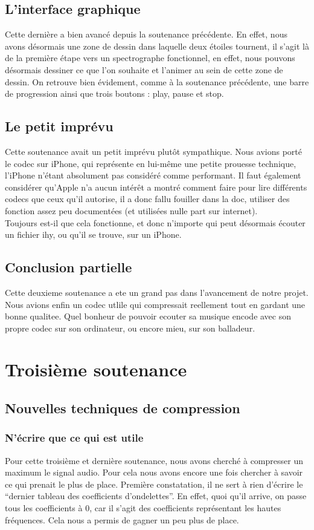 \documentclass[a4paper,12pt]{report}
\begin{document}
\subsection{L'interface graphique}
Cette dernière a bien avancé depuis la soutenance précédente. En effet, nous
avons désormais une zone de dessin dans laquelle deux étoiles tournent, il
s'agit là de la première étape vers un spectrographe fonctionnel, en effet, nous
pouvons désormais dessiner ce que l'on souhaite et l'animer au sein de cette
zone de dessin. On retrouve bien évidement, comme à la soutenance précédente,
une barre de progression ainsi que trois boutons : play, pause et stop.
\subsection{Le petit imprévu}
Cette soutenance avait un petit imprévu plutôt sympathique. Nous avions porté le
codec sur iPhone, qui représente en lui-même une petite prouesse technique,
l'iPhone n'étant absolument pas considéré comme performant. Il faut également
considérer qu'Apple n'a aucun intérêt a montré comment faire pour lire
différents codecs que ceux qu'il autorise, il a donc fallu fouiller dans la doc,
utiliser des fonction assez peu documentées (et utilisées nulle part sur
internet).\\
Toujours est-il que cela fonctionne, et donc n'importe qui peut désormais
écouter un fichier ihy, ou qu'il se trouve, sur un iPhone.
\subsection{Conclusion partielle}
Cette deuxieme soutenance a ete un grand pas dans l'avancement de
notre projet. Nous avions enfin un codec utlile qui compressait
reellement tout en gardant une bonne qualitee. Quel bonheur de pouvoir
ecouter sa musique encode avec son propre codec sur son ordinateur, ou
encore mieu, sur son balladeur.
\newpage

\section{Troisième soutenance}
\subsection{Nouvelles techniques de compression}
\subsubsection{N'écrire que ce qui est utile}
Pour cette troisième et dernière soutenance, nous avons cherché à compresser un
maximum le signal audio. Pour cela nous avons encore une fois chercher à savoir
ce qui prenait le plus de place. Première constatation, il ne sert à rien
d'écrire le ``dernier tableau des coefficients d'ondelettes''. En effet, quoi
qu'il arrive, on passe tous les coefficients à 0, car il s'agit des coefficients
représentant les hautes fréquences. Cela nous a permis de gagner un peu plus de
place.\\
\end{document}
